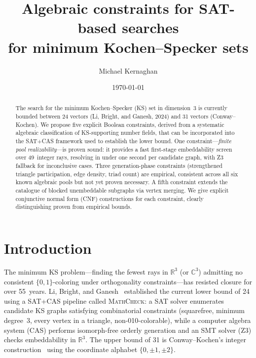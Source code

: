 \documentclass[twocolumn,prl,superscriptaddress,nofootinbib]{revtex4-2}
\newcommand{\R}{\mathbb{R}}
\newcommand{\C}{\mathbb{C}}
\begin{document}
\title{Algebraic constraints for SAT-based searches\\for minimum Kochen--Specker sets}

\author{Michael Kernaghan}

\date{\today}

\begin{abstract}
The search for the minimum Kochen--Specker (KS) set in dimension~3 is currently bounded between 24 vectors (Li, Bright, and Ganesh, 2024) and 31 vectors (Conway--Kochen). We propose five explicit Boolean constraints, derived from a systematic algebraic classification of KS-supporting number fields, that can be incorporated into the SAT+CAS framework used to establish the lower bound. One constraint---\emph{finite pool realizability}---is proven sound: it provides a fast first-stage embeddability screen over 49~integer rays, resolving in under one second per candidate graph, with Z3 fallback for inconclusive cases. Three generation-phase constraints (strengthened triangle participation, edge density, triad count) are empirical, consistent across all six known algebraic pools but not yet proven necessary. A fifth constraint extends the catalogue of blocked unembeddable subgraphs via vertex merging. We give explicit conjunctive normal form (CNF) constructions for each constraint, clearly distinguishing proven from empirical bounds.
\end{abstract}

\maketitle

\section{Introduction}

The minimum KS problem---finding the fewest rays in $\R^3$ (or $\C^3$) admitting no consistent $\{0,1\}$-coloring under orthogonality constraints---has resisted closure for over 55~years. Li, Bright, and Ganesh~\cite{LiBrightGanesh2024} established the current lower bound of 24 using a SAT+CAS pipeline called \textsc{MathCheck}: a SAT solver enumerates candidate KS graphs satisfying combinatorial constraints (squarefree, minimum degree~3, every vertex in a triangle, non-010-colorable), while a computer algebra system (CAS) performs isomorph-free orderly generation and an SMT solver (Z3) checks embeddability in $\R^3$.  The upper bound of 31 is Conway--Kochen's integer construction~\cite{ConwayKochen} using the coordinate alphabet $\{0, \pm1, \pm2\}$.
\end{document}
